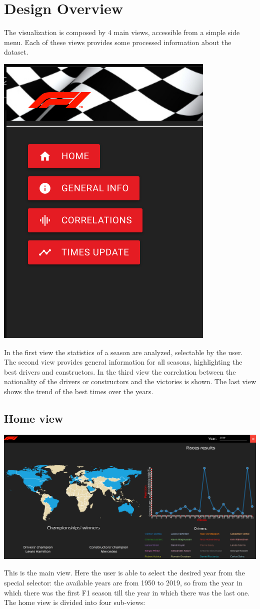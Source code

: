 \documentclass[11pt,twocolumn,letterpaper]{article}
\begin{document}
\section{Design Overview}
The visualization is composed by 4 main views, accessible from a simple side menu. Each of these views provides some processed information about the dataset.
\begin{center}
	\centering
	\includegraphics[width=0.3\columnwidth]{menu}
\end{center}
In the first view the statistics of a season are analyzed, selectable by the user. The second view provides general information for all seasons, highlighting the best drivers and constructors. In the third view the correlation between the nationality of the drivers or constructors and the victories is shown.  The last view shows the trend of the best times over the years.

\subsection{Home view}
\begin{center}
	\centering
	\includegraphics[width=\columnwidth]{home}
\end{center}

This is the main view. Here the user is able to select the desired year from the special selector: the available years are from 1950 to 2019, so from the year in which there was
the first F1 season till the year in which there was the last one. The home view is divided into four sub-views:
\end{document}
